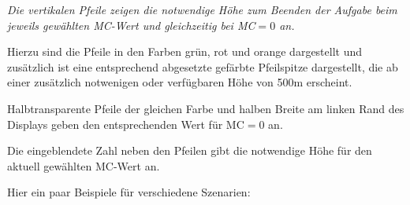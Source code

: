 \emph{Die vertikalen Pfeile zeigen die notwendige Höhe zum Beenden der Aufgabe
beim jeweils gewählten MC-Wert und gleichzeitig  bei MC$=0$ an.}

Hierzu sind die Pfeile in den Farben grün, rot und orange dargestellt und zusätzlich ist eine entsprechend
abgesetzte gefärbte Pfeilspitze dargestellt, die ab einer zusätzlich notwenigen oder verfügbaren Höhe
von 500m erscheint.

Halbtransparente Pfeile der gleichen Farbe und halben Breite am linken Rand des Displays geben den entsprechenden Wert für MC$=0$ an.

Die eingeblendete Zahl neben den Pfeilen gibt die notwendige Höhe für den aktuell gewählten  MC-Wert an.

Hier ein paar Beispiele für verschiedene Szenarien:

